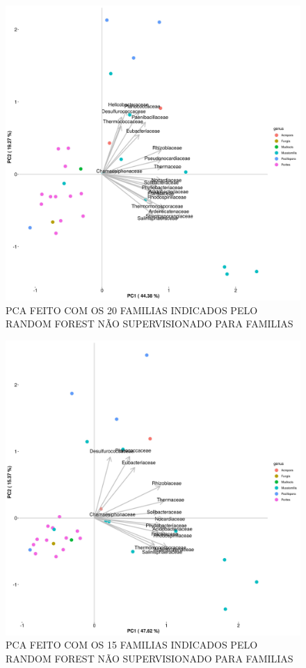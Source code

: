 \documentclass[12pt, a4paper]{report}
\begin{document}
\begin{figure}[H]
\centering
\includegraphics[scale=0.3]{figures/familia/pca_corais_mgrast_rf_nao_supervisionado_20_familias_30_10_2018.jpg}
\caption{PCA FEITO COM OS 20 FAMILIAS INDICADOS PELO RANDOM FOREST NÃO SUPERVISIONADO PARA FAMILIAS}
\label{fig:PCAFEITOCOM20FAMILIAS}
\end{figure}

\begin{figure}[H]
\centering
\includegraphics[scale=0.3]{figures/familia/pca_corais_mgrast_rf_nao_supervisionado_15_familias_30_10_2018.jpg}
\caption{PCA FEITO COM OS 15 FAMILIAS INDICADOS PELO RANDOM FOREST NÃO SUPERVISIONADO PARA FAMILIAS}
\label{fig:PCAFEITOCOM15FAMILIAS}
\end{figure}
\end{document}
